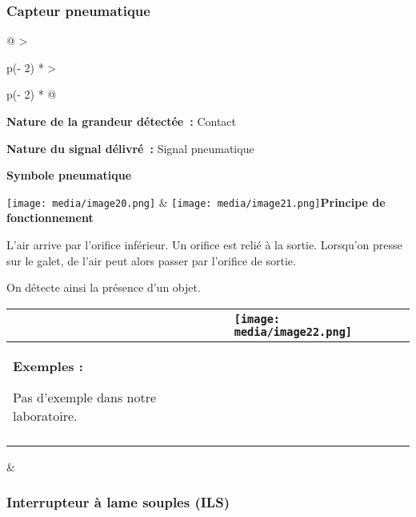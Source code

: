 \documentclass[
]{article}
\begin{document}
\hypertarget{capteur-pneumatique}{%
\subsubsection{Capteur pneumatique}\label{capteur-pneumatique}}

\begin{longtable}[]{@{}
  >{\raggedright\arraybackslash}p{(\columnwidth - 2\tabcolsep) * }
  >{\raggedright\arraybackslash}p{(\columnwidth - 2\tabcolsep) * }@{}}
\toprule
\textbf{Nature de la grandeur détectée~:} Contact

\textbf{Nature du signal délivré~:} Signal pneumatique

\textbf{Symbole pneumatique}

\texttt{[image: media/image20.png]} &
\texttt{[image: media/image21.png]}\textbf{Principe
de fonctionnement}

L'air arrive par l'orifice inférieur. Un orifice est relié à la sortie.
Lorsqu'on presse sur le galet, de l'air peut alors passer par l'orifice
de sortie.

On détecte ainsi la présence d'un objet. \\
\midrule
\endhead
\begin{minipage}[t]{\linewidth}\raggedright
\begin{longtable}[]{@{}
  >{\raggedright\arraybackslash}p{}
  >{\raggedright\arraybackslash}p{}@{}}
\toprule
&
\texttt{[image: media/image22.png]} \\
\midrule
\endhead
\textbf{Exemples :}

Pas d'exemple dans notre laboratoire. & \\
& \\
\bottomrule
\end{longtable}
\end{minipage} & \\
\bottomrule
\end{longtable}

\hypertarget{interrupteur-uxe0-lame-souples-ils}{%
\subsubsection{Interrupteur à lame souples
(ILS)}\label{interrupteur-uxe0-lame-souples-ils}}
\end{document}
